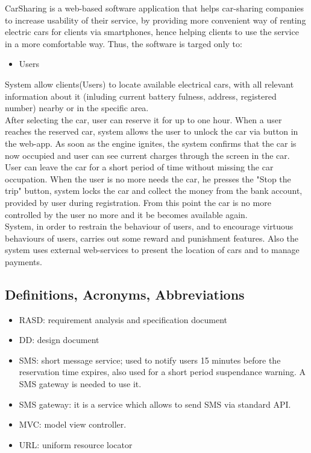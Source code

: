 \documentclass[12pt, letterpaper]{article}
\begin{document}
CarSharing is a web-based software application that helps car-sharing companies to increase usability of their service, by providing more convenient way of renting electric cars for clients via smartphones, hence helping clients to use the service in a more comfortable way. Thus, the software is targed only to:
\begin{itemize}
	\item Users
\end{itemize}    

System allow clients(Users) to locate available electrical cars, with all relevant information about it (inluding current battery fulness, address, registered number) nearby or in the specific area. \\ 
After selecting the car, user can reserve it for up to one hour. When a user reaches the reserved car, system allows the user to unlock the car via button in the web-app. As soon as the engine ignites, the system confirms that the car is now occupied and user can see current charges through the screen in
the car. \\
User can leave the car for a short period of time without missing the car occupation. When the user is no more needs the car, he presses the "Stop the trip" button, system locks the car and collect the money from the bank account, provided by user during registration. From this point the car is no more controlled by the user no more and it be becomes available again. \\
System, in order to restrain the behaviour of users, and to encourage virtuous behaviours of users, carries out some reward and punishment features.
Also the system uses external web-services to present the location of cars and to manage payments.   

\subsection{Definitions, Acronyms, Abbreviations}

\begin{itemize}
	\item RASD: requirement analysis and specification document 
	\item DD: design document
	\item SMS: short message service; used to notify users 15 minutes before the reservation time expires, also used for a short period suspendance warning. A SMS gateway is needed to use it.
	\item SMS gateway: it is a service which allows to send SMS via standard API.
	\item MVC: model view controller.
	\item URL: uniform resource locator
\end{itemize}
\end{document}

